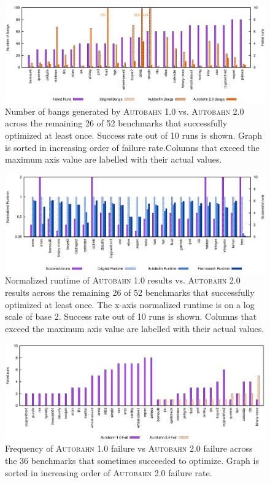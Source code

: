 \documentclass[format=sigplan, review=true]{acmart}
\newcommand{\Ao}[0]{\textsc{Autobahn 1.0}}
\newcommand{\At}[0]{\textsc{Autobahn 2.0}}
\begin{document}
\begin{figure}
\includegraphics[width=\textwidth]{pap1-bangs}
\caption{Number of bangs generated by \Ao{} vs. \At{} across the remaining 26 of 52 benchmarks that successfully optimized at least once. Success rate out of 10 runs is shown. Graph is sorted in increasing order of failure rate.Columns that exceed the maximum axis value are labelled with their actual values.}
\end{figure}

\begin{figure}
\includegraphics[width=\textwidth]{pap1}
\caption{Normalized runtime of \Ao{} results vs. \At{} results across the remaining 26 of 52 benchmarks that successfully optimized at least once. The x-axis normalized runtime is on a log scale of base 2. Success rate out of 10 runs is shown. Columns that exceed the maximum axis value are labelled with their actual values.}
\end{figure}

\begin{figure}
\includegraphics[width=\textwidth]{pap-fail}
\caption{Frequency of \Ao{} failure vs \At{} failure across the 36 benchmarks that sometimes succeeded to optimize. Graph is sorted in increasing order of \At{} failure rate. }
\end{figure}
\end{document}
